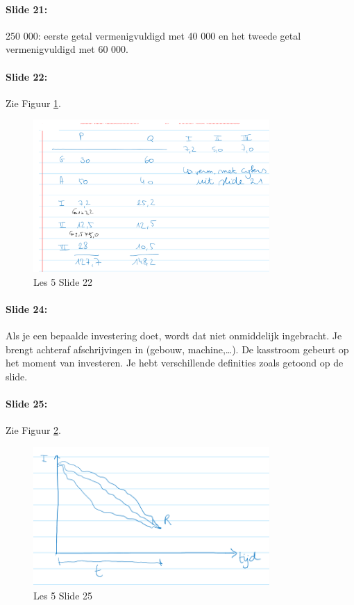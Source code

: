 \documentclass[10pt,a4paper]{report}
\begin{document}
\paragraph{Slide 21:} 250 000: eerste getal vermenigvuldigd met 40 000 en het tweede getal vermenigvuldigd met 60 000.

\paragraph{Slide 22:} Zie Figuur \ref{les05_04}.

\begin{figure}[h!]
\centering
\includegraphics[width=90mm]{Les05_04.png}
\caption{Les 5 Slide 22} 
\label{les05_04}
\end{figure}

\paragraph{Slide 24:} Als je een bepaalde investering doet, wordt dat niet onmiddelijk ingebracht. Je brengt achteraf afschrijvingen in (gebouw, machine,…). De kasstroom gebeurt op het moment van investeren. Je hebt verschillende definities zoals getoond op de slide.

\paragraph{Slide 25:} Zie Figuur \ref{les05_05}.


\begin{figure}[h!]
\centering
\includegraphics[width=90mm]{Les05_05.png}
\caption{Les 5 Slide 25} 
\label{les05_05}
\end{figure}
\end{document}
